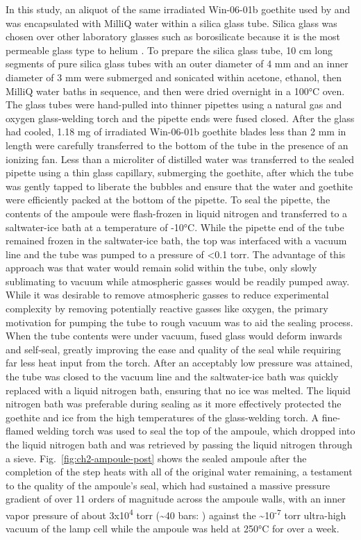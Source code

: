 In this study, an aliquot of the same irradiated Win-06-01b goethite
used by \citet{monteiro2017} and \citet{farley2024} was encapsulated with
MilliQ water within a silica glass tube. Silica glass was chosen over
other laboratory glasses such as borosilicate because it is the most
permeable glass type to helium \citep{norton1953,altemose1961}. To
prepare the silica glass tube, 10 cm long segments of pure silica glass
tubes with an outer diameter of 4 mm and an inner diameter of 3 mm were
submerged and sonicated within acetone, ethanol, then MilliQ water baths
in sequence, and then were dried overnight in a 100°C oven. The glass
tubes were hand-pulled into thinner pipettes using a natural gas and
oxygen glass-welding torch and the pipette ends were fused closed. After
the glass had cooled, 1.18 mg of irradiated Win-06-01b goethite blades
less than 2 mm in length were carefully transferred to the bottom of the
tube in the presence of an ionizing fan. Less than a microliter of
distilled water was transferred to the sealed pipette using a thin glass
capillary, submerging the goethite, after which the tube was gently
tapped to liberate the bubbles and ensure that the water and goethite
were efficiently packed at the bottom of the pipette. To seal the
pipette, the contents of the ampoule were flash-frozen in liquid
nitrogen and transferred to a saltwater-ice bath at a temperature of
-10°C. While the pipette end of the tube remained frozen in the
saltwater-ice bath, the top was interfaced with a vacuum line and the
tube was pumped to a pressure of \textless0.1 torr. The advantage of
this approach was that water would remain solid within the tube, only
slowly sublimating to vacuum while atmospheric gasses would be readily
pumped away. While it was desirable to remove atmospheric gasses to
reduce experimental complexity by removing potentially reactive gasses
like oxygen, the primary motivation for pumping the tube to rough vacuum
was to aid the sealing process. When the tube contents were under
vacuum, fused glass would deform inwards and self-seal, greatly
improving the ease and quality of the seal while requiring far less heat
input from the torch. After an acceptably low pressure was attained, the
tube was closed to the vacuum line and the saltwater-ice bath was
quickly replaced with a liquid nitrogen bath, ensuring that no ice was
melted. The liquid nitrogen bath was preferable during sealing as it
more effectively protected the goethite and ice from the high
temperatures of the glass-welding torch. A fine-flamed welding torch was
used to seal the top of the ampoule, which dropped into the liquid
nitrogen bath and was retrieved by passing the liquid nitrogen through a
sieve. Fig.~\ref{fig:ch2-ampoule-post} shows the sealed ampoule after the completion of the
step heats with all of the original water remaining, a testament to the
quality of the ampoule's seal, which had sustained a massive pressure
gradient of over 11 orders of magnitude across the ampoule walls, with
an inner vapor pressure of about 3x10\textsuperscript{4} torr
(\textasciitilde40 bars: \citet{haar1984}) against the
\textasciitilde10\textsuperscript{-7} torr ultra-high vacuum of the lamp
cell while the ampoule was held at 250°C for over a week.

